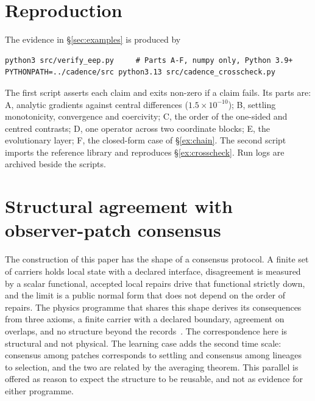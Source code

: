\documentclass[11pt]{article}
\theoremstyle{definition}
\theoremstyle{remark}
\begin{document}
\appendix

\section{Reproduction}
\label{app:repro}
The evidence in \S\ref{sec:examples} is produced by
\begin{verbatim}
python3 src/verify_eep.py     # Parts A-F, numpy only, Python 3.9+
PYTHONPATH=../cadence/src python3.13 src/cadence_crosscheck.py
\end{verbatim}
The first script asserts each claim and exits non-zero if a claim fails. Its parts are: A, analytic
gradients against central differences ($1.5\times10^{-10}$); B, settling monotonicity, convergence and
coercivity; C, the order of the one-sided and centred contrasts; D, one operator across two coordinate
blocks; E, the evolutionary layer; F, the closed-form case of \S\ref{ex:chain}. The second script
imports the reference library and reproduces \S\ref{ex:crosscheck}. Run logs are archived beside the
scripts.

\section{Structural agreement with observer-patch consensus}
The construction of this paper has the shape of a consensus protocol. A finite set of carriers holds
local state with a declared interface, disagreement is measured by a scalar functional, accepted local
repairs drive that functional strictly down, and the limit is a public normal form that does not depend
on the order of repairs. The physics programme that shares this shape derives its consequences from
three axioms, a finite carrier with a declared boundary, agreement on overlaps, and no structure beyond
the records~\cite{oph}. The correspondence here is structural and not physical. The learning case adds
the second time scale: consensus among patches corresponds to settling and consensus among lineages to
selection, and the two are related by the averaging theorem. This parallel is offered as reason to
expect the structure to be reusable, and not as evidence for either programme.
\end{document}
